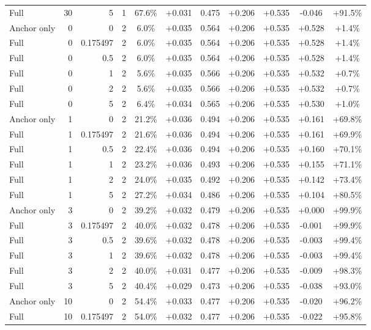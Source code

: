 \begin{table}[htbp]
\begin{tabular}{lrrrccccccc}
Full & 30 & 5 & 1 & 67.6\% & +0.031 & 0.475 & +0.206 & +0.535 & -0.046 & +91.5\% \\
Anchor only & 0 & 0 & 2 & 6.0\% & +0.035 & 0.564 & +0.206 & +0.535 & +0.528 & +1.4\% \\
Full & 0 & 0.175497 & 2 & 6.0\% & +0.035 & 0.564 & +0.206 & +0.535 & +0.528 & +1.4\% \\
Full & 0 & 0.5 & 2 & 6.0\% & +0.035 & 0.564 & +0.206 & +0.535 & +0.528 & +1.4\% \\
Full & 0 & 1 & 2 & 5.6\% & +0.035 & 0.566 & +0.206 & +0.535 & +0.532 & +0.7\% \\
Full & 0 & 2 & 2 & 5.6\% & +0.035 & 0.566 & +0.206 & +0.535 & +0.532 & +0.7\% \\
Full & 0 & 5 & 2 & 6.4\% & +0.034 & 0.565 & +0.206 & +0.535 & +0.530 & +1.0\% \\
Anchor only & 1 & 0 & 2 & 21.2\% & +0.036 & 0.494 & +0.206 & +0.535 & +0.161 & +69.8\% \\
Full & 1 & 0.175497 & 2 & 21.6\% & +0.036 & 0.494 & +0.206 & +0.535 & +0.161 & +69.9\% \\
Full & 1 & 0.5 & 2 & 22.4\% & +0.036 & 0.494 & +0.206 & +0.535 & +0.160 & +70.1\% \\
Full & 1 & 1 & 2 & 23.2\% & +0.036 & 0.493 & +0.206 & +0.535 & +0.155 & +71.1\% \\
Full & 1 & 2 & 2 & 24.0\% & +0.035 & 0.492 & +0.206 & +0.535 & +0.142 & +73.4\% \\
Full & 1 & 5 & 2 & 27.2\% & +0.034 & 0.486 & +0.206 & +0.535 & +0.104 & +80.5\% \\
Anchor only & 3 & 0 & 2 & 39.2\% & +0.032 & 0.479 & +0.206 & +0.535 & +0.000 & +99.9\% \\
Full & 3 & 0.175497 & 2 & 40.0\% & +0.032 & 0.478 & +0.206 & +0.535 & -0.001 & +99.9\% \\
Full & 3 & 0.5 & 2 & 39.6\% & +0.032 & 0.478 & +0.206 & +0.535 & -0.003 & +99.4\% \\
Full & 3 & 1 & 2 & 39.6\% & +0.032 & 0.478 & +0.206 & +0.535 & -0.003 & +99.4\% \\
Full & 3 & 2 & 2 & 40.0\% & +0.031 & 0.477 & +0.206 & +0.535 & -0.009 & +98.3\% \\
Full & 3 & 5 & 2 & 40.4\% & +0.029 & 0.473 & +0.206 & +0.535 & -0.038 & +93.0\% \\
Anchor only & 10 & 0 & 2 & 54.4\% & +0.033 & 0.477 & +0.206 & +0.535 & -0.020 & +96.2\% \\
Full & 10 & 0.175497 & 2 & 54.0\% & +0.032 & 0.477 & +0.206 & +0.535 & -0.022 & +95.8\% \\

\end{tabular}
\end{table}
